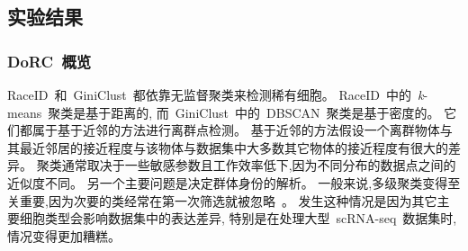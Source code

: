 \begin{table}[!htbp]
  \end{table}

\subsection{实验结果}
\subsubsection{DoRC~概览}
\label{subsec:dorc}
RaceID~和~GiniClust~都依靠无监督聚类来检测稀有细胞。
RaceID~中的~\textit{k}-means~聚类是基于距离的,
而~GiniClust~中的~DBSCAN~聚类是基于密度的。
它们都属于基于近邻的方法进行离群点检测。
基于近邻的方法假设一个离群物体与其最近邻居的接近程度与该物体与数据集中大多数其它物体的接近程度有很大的差异。
聚类通常取决于一些敏感参数且工作效率低下,因为不同分布的数据点之间的近似度不同。
另一个主要问题是决定群体身份的解析。
一般来说,多级聚类变得至关重要,因为次要的类经常在第一次筛选就被忽略~\cite{campbell2017molecular}。
发生这种情况是因为其它主要细胞类型会影响数据集中的表达差异,
特别是在处理大型~scRNA-seq~数据集时,情况变得更加糟糕。

